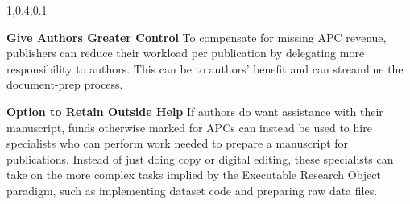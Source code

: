 \begin{frame}{}
{\begin{minipage}{1.08\textwidth}
\begin{lightquadblockc}{1,0.4,0.1}{\parbox{21cm}{\centering \vspace{13pt}\color[rgb]{0,0,0}{According 
to the Diamond (DOA) model, publications have neither 
Article Processing Charges (APCs) nor paywalls}\vspace{8pt}}}
\begin{minipage}{1.07\textwidth}
{\begin{enumerate}
\dmitem \textbf{Give Authors Greater Control} \hspace{.5em} To compensate 
for missing APC revenue, publishers can reduce their workload per 
publication by delegating more responsibility to authors.  
This can be to authors' benefit and can streamline the document-prep process. \vspace{12pt} 

\dmitem \textbf{Option to Retain Outside Help} \hspace{.5em} If authors 
do want assistance with their manuscript, funds otherwise marked for 
APCs can instead be used to hire specialists who can perform 
work needed to prepare a manuscript for publications.  Instead 
of just doing copy or digital editing, these specialists can 
take on the more complex tasks implied by the Executable 
Research Object paradigm, such as implementing dataset code
and preparing raw data files.

\end{enumerate}
}\end{minipage}
\end{lightquadblockc}
\end{minipage}

}

\end{frame}

